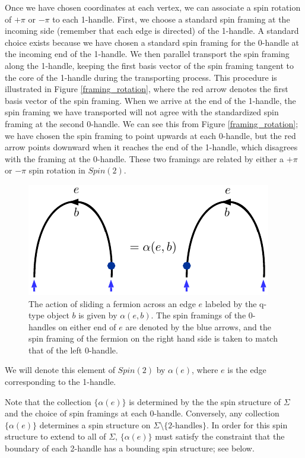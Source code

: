 \documentclass[12pt,a4paper]{article}
\newcounter{arrow}
\begin{document}
Once we have chosen coordinates at each vertex, we can associate a spin rotation of $+\pi$ or
$-\pi$ to each 1-handle.
First, we choose a standard spin framing at the incoming side (remember that each edge is directed) of the 1-handle.
A standard choice exists because we have chosen a standard spin framing for the 0-handle at the incoming end of the 1-handle. 
We then parallel transport the spin framing along the 1-handle, keeping the first basis vector of the spin framing tangent to 
the core of
the 1-handle during the transporting process.
This procedure is illustrated in Figure \ref{framing_rotation}, where the red arrow denotes the first basis vector of the spin framing. 
When we arrive at the end of the 1-handle, the spin framing we have transported will not agree with the standardized spin framing at the second 0-handle. 
We can see this from Figure \ref{framing_rotation}; we have chosen the spin framing to point upwards at each 0-handle, but the red arrow points downward when it reaches the end of the 1-handle, which disagrees with the framing at the 0-handle. 
These two framings are related by either a $+\pi$ or $-\pi$ spin rotation in $Spin(2)$.
\begin{figure}
\begin{center}
\includegraphics{alphae_defn.pdf}
\caption{\label{alphae_defn} The action of sliding a fermion across an edge $e$ labeled by the q-type object $b$ is given by $\alpha(e,b)$. 
The spin framings of the 0-handles on either end of $e$ are denoted by the blue arrows, 
and  the spin framing of the fermion on the right hand side is taken to match that of the left 0-handle. }
\end{center}
\end{figure}
We will denote this element of $Spin(2)$ by $\alpha(e)$, where $e$ is the edge corresponding to the 1-handle.

Note that the collection $\{\alpha(e)\}$ is determined by the the spin structure of $\Sigma$ and
the choice of spin framings at each 0-handle.
Conversely, any collection $\{\alpha(e)\}$ determines a spin structure on $\Sigma\setminus\{\mbox{2-handles}\}$.
In order for this spin structure to extend to all of $\Sigma$, $\{\alpha(e)\}$ must satisfy the constraint that the 
boundary of each 2-handle has a bounding spin structure; see below.
\end{document}
